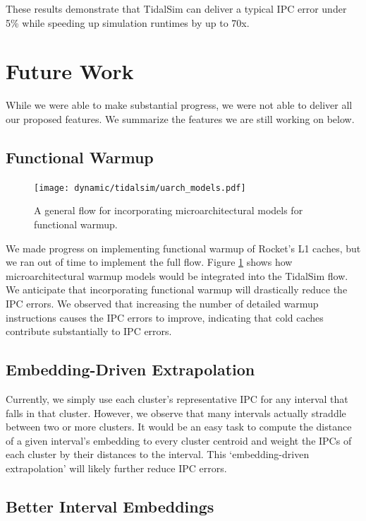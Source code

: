 \documentclass[sigplan,nonacm,10pt]{acmart}
\begin{document}
These results demonstrate that TidalSim can deliver a typical IPC error under 5\% while speeding up simulation runtimes by up to 70x.

\section{Future Work}

While we were able to make substantial progress, we were not able to deliver all our proposed features.
We summarize the features we are still working on below.

\subsection{Functional Warmup}

\begin{figure}
  \texttt{[image: dynamic/tidalsim/uarch\_models.pdf]}
  \caption{A general flow for incorporating microarchitectural models for functional warmup.}
  \label{fig:uarch_models}
\end{figure}

We made progress on implementing functional warmup of Rocket's L1 caches, but we ran out of time to implement the full flow.
Figure \ref{fig:uarch_models} shows how microarchitectural warmup models would be integrated into the TidalSim flow.
We anticipate that incorporating functional warmup will drastically reduce the IPC errors.
We observed that increasing the number of detailed warmup instructions causes the IPC errors to improve, indicating that cold caches contribute substantially to IPC errors.

\subsection{Embedding-Driven Extrapolation}

Currently, we simply use each cluster's representative IPC for any interval that falls in that cluster.
However, we observe that many intervals actually straddle between two or more clusters.
It would be an easy task to compute the distance of a given interval's embedding to every cluster centroid and weight the IPCs of each cluster by their distances to the interval.
This `embedding-driven extrapolation' will likely further reduce IPC errors.

\subsection{Better Interval Embeddings}
\end{document}
